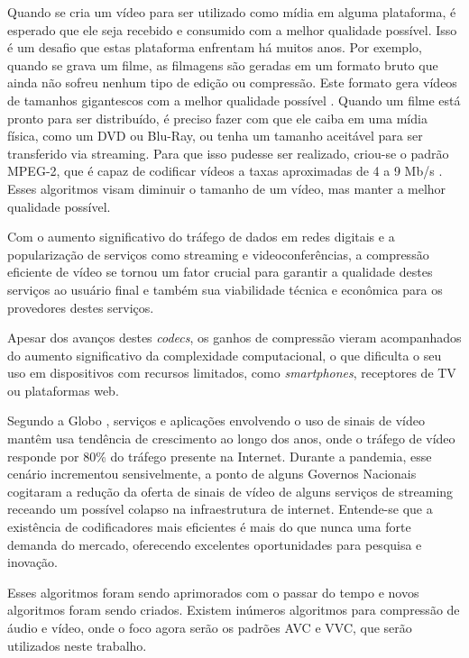 Quando se cria um vídeo para ser utilizado como mídia em alguma plataforma, é esperado
que ele seja recebido e consumido com a melhor qualidade possível. Isso é um desafio
que estas plataforma enfrentam há muitos anos. Por exemplo, quando se grava um filme,
as filmagens são geradas em um formato bruto que ainda não sofreu nenhum tipo de edição
ou compressão. Este formato gera vídeos de tamanhos gigantescos com a melhor qualidade
possível \cite{what_is_raw_footage}. Quando um filme está pronto para ser distribuído,
é preciso fazer com que ele caiba em uma mídia física, como um DVD ou Blu-Ray, ou tenha
um tamanho aceitável para ser transferido via streaming. Para que isso pudesse ser
realizado, criou-se o padrão MPEG-2, que é capaz de codificar vídeos a taxas aproximadas
de 4 a 9 Mb/s \cite{mpeg2}. Esses algoritmos visam diminuir o tamanho de um vídeo,
mas manter a melhor qualidade possível.

Com o aumento significativo do tráfego de dados em redes digitais e a popularização
de serviços como streaming e videoconferências, a compressão eficiente de vídeo
se tornou um fator crucial para garantir a qualidade destes serviços ao usuário
final e também sua viabilidade técnica e econômica para os provedores destes
serviços.

Apesar dos avanços destes \textit{codecs}, os ganhos de compressão vieram acompanhados do
aumento significativo da complexidade computacional, o que dificulta o seu uso em
dispositivos com recursos limitados, como \textit{smartphones}, receptores de TV ou
plataformas web.

Segundo a Globo \cite{globo_panorama}, serviços e aplicações envolvendo o uso de sinais
de vídeo mantêm usa tendência de crescimento ao longo dos anos, onde o tráfego de
vídeo responde por 80\% do tráfego presente na Internet. Durante a pandemia, esse cenário
incrementou sensivelmente, a ponto de alguns Governos Nacionais cogitaram a redução da oferta 
de sinais de vídeo de alguns serviços de streaming receando um possível colapso na
infraestrutura de internet. Entende-se que a existência de codificadores
mais eficientes é mais do que nunca uma forte demanda do mercado, oferecendo excelentes
oportunidades para pesquisa e inovação.

Esses algoritmos foram sendo aprimorados com o passar do tempo e novos algoritmos
foram sendo criados. Existem inúmeros algoritmos para compressão de áudio e vídeo,
onde o foco agora serão os padrões \acrfull{AVC} e \acrfull{VVC}, que serão utilizados
neste trabalho.

